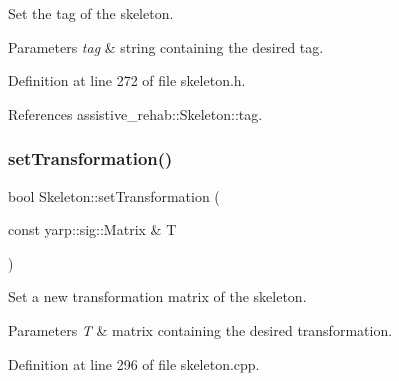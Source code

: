Set the tag of the skeleton. 


\begin{DoxyParams}{Parameters}
{\em tag} & string containing the desired tag. \\
\hline
\end{DoxyParams}


Definition at line 272 of file skeleton.\+h.


\begin{DoxyCode}{0}

\end{DoxyCode}


References assistive\+\_\+rehab\+::\+Skeleton\+::tag.

\mbox{\label{classassistive__rehab_1_1Skeleton_a3486cbd7f59e75c1d9ef26cbc05bb72f}} 
\subsubsection{\texorpdfstring{setTransformation()}{setTransformation()}}
{\footnotesize\ttfamily bool Skeleton\+::set\+Transformation (\begin{DoxyParamCaption}\item[{const yarp\+::sig\+::\+Matrix \&}]{T }\end{DoxyParamCaption})\hspace{0.3cm}{\ttfamily [inherited]}}



Set a new transformation matrix of the skeleton. 


\begin{DoxyParams}{Parameters}
{\em T} & matrix containing the desired transformation. \\
\hline
\end{DoxyParams}


Definition at line 296 of file skeleton.\+cpp.


\begin{DoxyCode}{0}

\end{DoxyCode}


